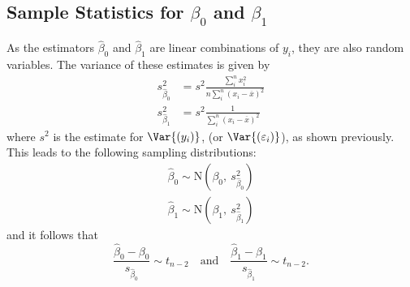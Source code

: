 \documentclass{article}
\begin{document}
\subsection{Sample Statistics for \texorpdfstring{$\beta_0$}{beta 0} and \texorpdfstring{$\beta_1$}{beta 1}}
As the estimators $\hat{\beta}_0$ and $\hat{\beta}_1$ are linear combinations of $y_i$, they are also random variables. The variance of these estimates is given by
\begin{align*}
    s_{\hat{\beta}_0}^2 & = s^2 \frac{\sum_i^n x_i^2}{n\sum_i^n \left( x_i - \overline{x} \right)^2} \\
    s_{\hat{\beta}_1}^2 & = s^2 \frac{1}{\sum_i^n \left( x_i - \overline{x} \right)^2}
\end{align*}
where $s^2$ is the estimate for $\Var{\left( y_i \right)}$, (or $\Var{\left( \varepsilon_i \right)}$), as shown previously.
This leads to the following sampling distributions:
\begin{align*}
    \hat{\beta}_0 \sim \mathrm{N}{\left( \beta_0,\: s_{\hat{\beta}_0}^2 \right)} \\
    \hat{\beta}_1 \sim \mathrm{N}{\left( \beta_1,\: s_{\hat{\beta}_1}^2 \right)}
\end{align*}
and it follows that
\begin{equation*}
    \frac{\hat{\beta}_0 - \beta_0}{s_{\hat{\beta}_0}} \sim t_{n-2} \quad \text{and} \quad \frac{\hat{\beta}_1 - \beta_1}{s_{\hat{\beta}_1}} \sim t_{n-2}.
\end{equation*}
\end{document}
